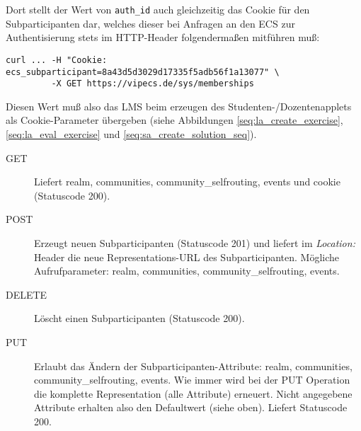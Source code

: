 \documentclass[dvips,12pt,a4paper]{article}
\begin{document}
Dort stellt der Wert von \texttt{auth\_id} auch gleichzeitig das Cookie für den
Subparticipanten dar, welches dieser bei Anfragen an den ECS zur
Authentisierung stets im HTTP-Header folgendermaßen mitführen muß:
\begin{verbatim}
curl ... -H "Cookie: ecs_subparticipant=8a43d5d3029d17335f5adb56f1a13077" \
         -X GET https://vipecs.de/sys/memberships
\end{verbatim}
Diesen Wert muß also das LMS beim erzeugen des Studenten-/Dozentenapplets als
Cookie-Parameter übergeben (siehe Abbildungen \ref{seq:la_create_exercise},
\ref{seq:la_eval_exercise} und \ref{seq:sa_create_solution_seq}).
\begin{description}
  \item[GET] Liefert realm, communities, community\_selfrouting, events und cookie (Statuscode 200).
  \item[POST] Erzeugt neuen Subparticipanten (Statuscode 201) und liefert im \textit{Location:} Header die neue Representations-URL des Subparticipanten. Mögliche Aufrufparameter: realm, communities, community\_selfrouting, events.
  \item[DELETE] Löscht einen Subparticipanten (Statuscode 200).
  \item[PUT] Erlaubt das Ändern der Subparticipanten-Attribute: realm, communities, community\_selfrouting, events. Wie immer wird bei der PUT Operation die komplette Representation (alle Attribute) erneuert. Nicht angegebene Attribute erhalten also den Defaultwert (siehe oben). Liefert Statuscode 200.
\end{description}
\end{document}
